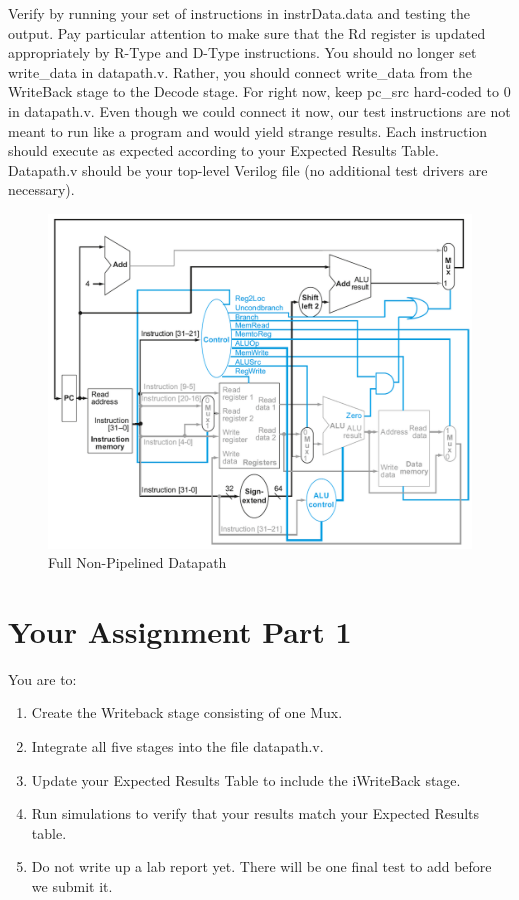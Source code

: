 Verify by running your set of instructions in instrData.data and testing the output.  Pay particular attention to make sure that the Rd register is updated appropriately by R-Type and D-Type instructions.  You should no longer set write\_data in datapath.v.  Rather, you should connect write\_data from the WriteBack stage to the Decode stage.  For right now, keep pc\_src hard-coded to 0 in datapath.v.  Even though we could connect it now, our test instructions are not meant to run like a program and would yield strange results.  Each instruction should execute as expected according to your Expected Results Table.  Datapath.v should be your top-level Verilog file (no additional test drivers are necessary).

\begin{figure}
\caption{Full Non-Pipelined Datapath}\label{fig:datapath}
\begin{center}
\includegraphics[width=\textwidth]{../images/non_pipelined_datapath.png}
\end{center}
\end{figure}

\section{Your Assignment Part 1}

You are to:
\begin{enumerate}
\item Create the Writeback stage consisting of one Mux.
\item Integrate all five stages into the file datapath.v.
\item Update your Expected Results Table to include the iWriteBack stage.
\item Run simulations to verify that your results match your Expected Results table.   
\item Do not write up a lab report yet. There will be one final test to add before we submit it.
\end{enumerate} 

